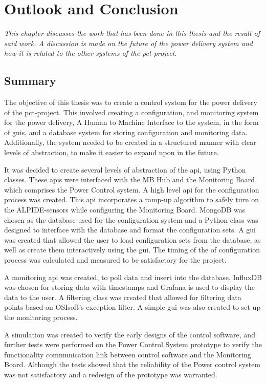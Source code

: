 \documentclass[main.tex]{subfiles}
\begin{document}
\section{Outlook and Conclusion}
\textit{This chapter discusses the work that has been done in this thesis and the result of said work. A discussion is made on the future of the power delivery system and how it is related to the other systems of the \gls{pct}-project.}

\subsection{Summary}

The objective of this thesis was to create a control system for the power delivery of the \gls{pct}-project. This involved creating a configuration, and monitoring system for the power delivery, A Human to Machine Interface to the system, in the form of \gls{gui}s, and a database system for storing configuration and monitoring data. Additionally, the system needed to be created in a structured manner with clear levels of abstraction, to make it easier to expand upon in the future.

It was decided to create several levels of abstraction of the \gls{api}, using Python classes. These \gls{api}s were interfaced with the MB Hub and the Monitoring Board, which comprises the Power Control system. A high level \gls{api} for the configuration process was created. This \gls{api} incorporates a ramp-up algorithm to safely turn on the ALPIDE-sensors while configuring the Monitoring Board. MongoDB was chosen as the database used for the configuration system and a Python class was designed to interface with the database and format the configuration sets. A \gls{gui} was created that allowed the user to load configuration sets from the database, as well as create them interactively using the \gls{gui}. The timing of the of configuration process was calculated and measured to be satisfactory for the project.

A monitoring \gls{api} was created, to poll data and insert into the database. InfluxDB was chosen for storing data with timestamps and Grafana is used to display the data to the user. A filtering class was created that allowed for filtering data points based on OSIsoft's exception filter. A simple \gls{gui} was also created to set up the monitoring process.

A simulation was created to verify the early designs of the control software, and further tests were performed on the Power Control System prototype to verify the functionality communication link between control software and the Monitoring Board. Although the tests showed that the reliability of the Power control system was not satisfactory and a redesign of the prototype was warranted.
\end{document}
